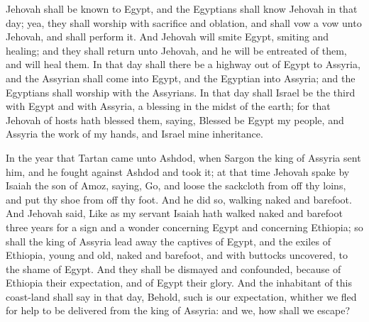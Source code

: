 Jehovah shall be known to Egypt, and the Egyptians shall know Jehovah in that day; yea, they shall worship with sacrifice and oblation, and shall vow a vow unto Jehovah, and shall perform it. And Jehovah will smite Egypt, smiting and healing; and they shall return unto Jehovah, and he will be entreated of them, and will heal them.  In that day shall there be a highway out of Egypt to Assyria, and the Assyrian shall come into Egypt, and the Egyptian into Assyria; and the Egyptians shall worship with the Assyrians.  In that day shall Israel be the third with Egypt and with Assyria, a blessing in the midst of the earth; for that Jehovah of hosts hath blessed them, saying, Blessed be Egypt my people, and Assyria the work of my hands, and Israel mine inheritance. 

In the year that Tartan came unto Ashdod, when Sargon the king of Assyria sent him, and he fought against Ashdod and took it; at that time Jehovah spake by Isaiah the son of Amoz, saying, Go, and loose the sackcloth from off thy loins, and put thy shoe from off thy foot. And he did so, walking naked and barefoot. And Jehovah said, Like as my servant Isaiah hath walked naked and barefoot three years for a sign and a wonder concerning Egypt and concerning Ethiopia; so shall the king of Assyria lead away the captives of Egypt, and the exiles of Ethiopia, young and old, naked and barefoot, and with buttocks uncovered, to the shame of Egypt. And they shall be dismayed and confounded, because of Ethiopia their expectation, and of Egypt their glory. And the inhabitant of this coast-land shall say in that day, Behold, such is our expectation, whither we fled for help to be delivered from the king of Assyria: and we, how shall we escape? 

